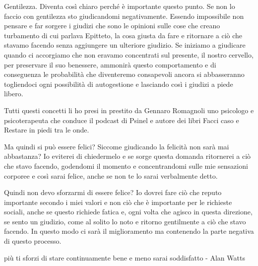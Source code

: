 \documentclass[12pt]{book} %
\begin{document}
Gentilezza. Diventa così chiaro perché è importante questo punto. Se non lo faccio con gentilezza sto giudicandomi
negativamente. Essendo impossibile non pensare e far sorgere i giudizi che sono le opinioni sulle cose che creano
turbamento di cui parlava Epitteto, la cosa giusta da fare e ritornare a ciò che stavamo facendo senza aggiungere un
ulteriore giudizio. Se iniziamo a giudicare quando ci accorgiamo che non eravamo concentrati sul presente, il nostro
cervello, per preservare il suo benessere, ammonirà questo comportamento e di conseguenza le probabilità che
diventeremo consapevoli ancora si abbasseranno togliendoci ogni possibilità di autogestione e lasciando così i giudizi
a piede libero.

Tutti questi concetti li ho presi in prestito da Gennaro Romagnoli uno psicologo e psicoterapeuta che conduce il podcast
di Psinel e autore dei libri Facci caso e Restare in piedi tra le onde.

Ma quindi si può essere felici? Siccome giudicando la felicità non sarà mai abbastanza? Io eviterei di chiedermelo e se
sorge questa domanda ritornerei a ciò che stavo facendo, godendomi il momento e concentrandomi sulle mie sensazioni
corporee e così sarai felice, anche se non te lo sarai verbalmente detto. 

Quindi non devo sforzarmi di essere felice? Io dovrei fare ciò che reputo importante secondo i miei valori e non ciò che
è importante per le richieste sociali, anche se questo richiede fatica e, ogni volta che agisco in questa direzione, se
sento un giudizio, come al solito lo noto e ritorno gentilmente a ciò che stavo facendo. In questo modo ci sarà il
miglioramento ma contenendo la parte negativa di questo processo. 

più ti sforzi di stare continuamente bene e meno sarai soddisfatto - Alan Watts


\bigskip


\bigskip


\bigskip


\bigskip


\bigskip


\bigskip


\bigskip
\end{document}
